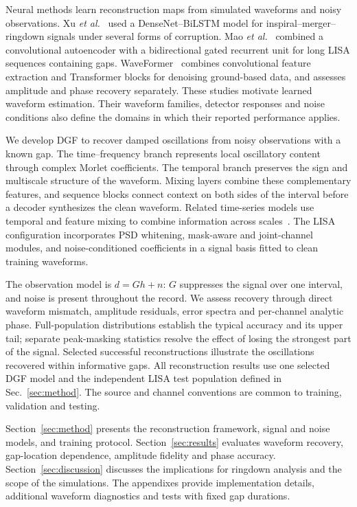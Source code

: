\documentclass[10pt,prd,aps,a4paper,twocolumn,superscriptaddress,nofootinbib,floatfix]{revtex4-2}
\begin{document}
Neural methods learn reconstruction maps from simulated waveforms and noisy observations. Xu \textit{et al.}~\cite{Xu_2024} used a DenseNet--BiLSTM model for inspiral--merger--ringdown signals under several forms of corruption. Mao \textit{et al.}~\cite{Mao:2025cae} combined a convolutional autoencoder with a bidirectional gated recurrent unit for long LISA sequences containing gaps. WaveFormer~\cite{Wang:2024waveformer} combines convolutional feature extraction and Transformer blocks for denoising ground-based data, and assesses amplitude and phase recovery separately. These studies motivate learned waveform estimation. Their waveform families, detector responses and noise conditions also define the domains in which their reported performance applies.

We develop DGF to recover damped oscillations from noisy observations with a known gap. The time--frequency branch represents local oscillatory content through complex Morlet coefficients. The temporal branch preserves the sign and multiscale structure of the waveform. Mixing layers combine these complementary features, and sequence blocks connect context on both sides of the interval before a decoder synthesizes the clean waveform. Related time-series models use temporal and feature mixing to combine information across scales~\cite{TSMixer2023,TimeMixer2024}. The LISA configuration incorporates PSD whitening, mask-aware and joint-channel modules, and noise-conditioned coefficients in a signal basis fitted to clean training waveforms.

The observation model is $d=Gh+n$: $G$ suppresses the signal over one interval, and noise is present throughout the record. We assess recovery through direct waveform mismatch, amplitude residuals, error spectra and per-channel analytic phase. Full-population distributions establish the typical accuracy and its upper tail; separate peak-masking statistics resolve the effect of losing the strongest part of the signal. Selected successful reconstructions illustrate the oscillations recovered within informative gaps. All reconstruction results use one selected DGF model and the independent LISA test population defined in Sec.~\ref{sec:method}. The source and channel conventions are common to training, validation and testing.

Section~\ref{sec:method} presents the reconstruction framework, signal and noise models, and training protocol. Section~\ref{sec:results} evaluates waveform recovery, gap-location dependence, amplitude fidelity and phase accuracy. Section~\ref{sec:discussion} discusses the implications for ringdown analysis and the scope of the simulations. The appendixes provide implementation details, additional waveform diagnostics and tests with fixed gap durations.
\end{document}
